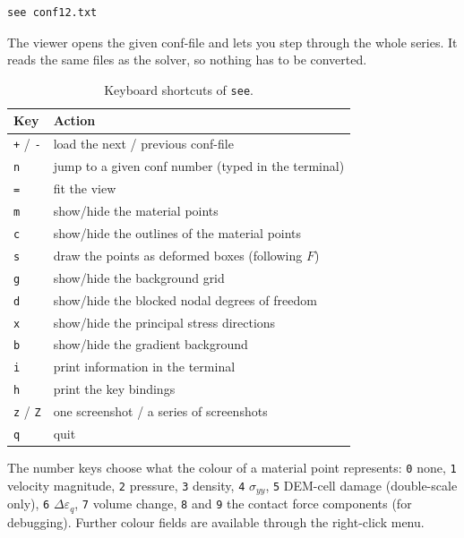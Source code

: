 \documentclass[a4paper,onecolumn,11pt]{doofus}
\begin{document}
\begin{lstlisting}[style=mystyle,numbers=none]
see conf12.txt
\end{lstlisting}

The viewer opens the given conf-file and lets you step through the whole series. It reads the
same files as the solver, so nothing has to be converted.

\begin{table}[H]
\centering
\begin{tabular}{ll}
\toprule
\textbf{Key} & \textbf{Action}\\
\midrule
\texttt{+} / \texttt{-} & load the next / previous conf-file \\
\texttt{n}              & jump to a given conf number (typed in the terminal) \\
\texttt{=}              & fit the view \\
\texttt{m}              & show/hide the material points \\
\texttt{c}              & show/hide the outlines of the material points \\
\texttt{s}              & draw the points as deformed boxes (following $F$) \\
\texttt{g}              & show/hide the background grid \\
\texttt{d}              & show/hide the blocked nodal degrees of freedom \\
\texttt{x}              & show/hide the principal stress directions \\
\texttt{b}              & show/hide the gradient background \\
\texttt{i}              & print information in the terminal \\
\texttt{h}              & print the key bindings \\
\texttt{z} / \texttt{Z} & one screenshot / a series of screenshots \\
\texttt{q}              & quit \\
\bottomrule
\end{tabular}
\caption{Keyboard shortcuts of \texttt{see}.}
\label{tab:seekeys}
\end{table}

The number keys choose what the colour of a material point represents: \texttt{0} none,
\texttt{1} velocity magnitude, \texttt{2} pressure, \texttt{3} density, \texttt{4}
$\sigma_{yy}$, \texttt{5} DEM-cell damage (double-scale only), \texttt{6} $\Delta\varepsilon_q$,
\texttt{7} volume change, \texttt{8} and \texttt{9} the contact force components (for
debugging). Further colour fields are available through the right-click menu.
\end{document}
